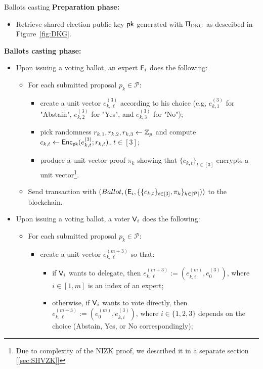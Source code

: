 \begin{boxfig}{\label{fig:vote}Ballots casting}{}
\footnotesize
	\textbf{Preparation phase:}
	\begin{itemize}
	    \item Retrieve shared election public key $\mathsf{pk}$ generated with $\Pi_{\textsc{DKG}}$ as desceibed in Figure~\ref{fig:DKG}.
	\end{itemize}	
	
	\textbf{Ballots casting phase:}
	\begin{itemize}
		\item Upon issuing a voting ballot, an expert $\mathsf{E}_i$ does the following:
		\begin{itemize}
			\item For each submitted proposal $p_k \in \mathcal{P}$: 
			\begin{itemize}
			    \item create a unit vector $e^{(3)}_{k,\ell}$ according to his choice (e.g, $e^{(3)}_{k,1}$ for "Abstain", $e^{(3)}_{k,2}$ for "Yes", and $e^{(3)}_{k,3}$ for "No");
			    \item pick randomness $r_{k,1},r_{k,2},r_{k,3}\leftarrow \mathbb{Z}_p$ and compute $c_{k,t}\leftarrow \mathsf{Enc}_{\mathsf{pk}}(e^{(3)}_{k,t}; r_{k,t})$, $t\in[3]$;
			    \item produce a unit vector proof $\pi_k$ showing that $\{c_{k,t}\}_{t\in[3]}$ encrypts a unit vector\footnote{Due to complexity of the NIZK proof, we described it in a separate section [\ref{sec:SHVZK}]}.
			\end{itemize}
			  
			\item Send transaction with $(Ballot, (\mathsf{E}_i, \{\{c_{k,t}\}_{t\in[3]}, \pi_k\}_{k \in |\mathcal{P}|}))$ to the blockchain.
		\end{itemize}	
		
		\item Upon issuing a voting ballot, a voter $\mathsf{V}_i$ does the following:
		\begin{itemize}
			\item For each submitted proposal $p_k \in \mathcal{P}$: 
			\begin{itemize}
			    \item create a unit vector $e^{(m+3)}_{k,\ell}$ so that:
			    \begin{itemize}
			        \item if $\mathsf{V}_i$ wants to delegate, then $e^{(m+3)}_{k,\ell}:= (e^{(m)}_{k,i}, e^{(3)}_0)$, where $i \in [1,m]$ is an index of an expert;
			        \item otherwise, if $\mathsf{V}_i$ wants to vote directly, then $e^{(m+3)}_{k,\ell}:= (e^{(m)}_0, e^{(3)}_{k,i})$, where $i \in \{1,2,3\}$ depends on the choice (Abstain, Yes, or No correspondingly);
			    \end{itemize}


\end{itemize}
\end{itemize}
\end{itemize}
\end{boxfig}
